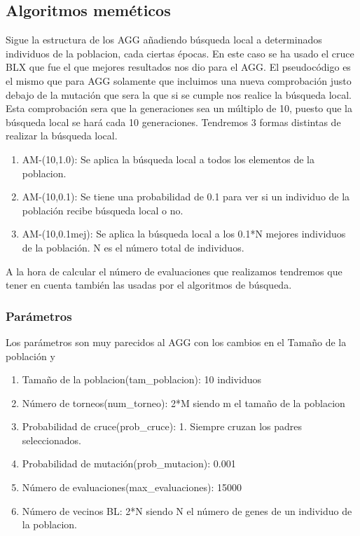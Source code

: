 \documentclass[titlepage]{article}
\begin{document}
	\subsection{Algoritmos meméticos}
	Sigue la estructura de los AGG añadiendo búsqueda local a determinados individuos de la poblacion, cada ciertas épocas. En este caso se ha usado el cruce BLX que fue el que mejores resultados nos dio para el AGG. El pseudocódigo es el mismo que para AGG solamente que incluimos una nueva comprobación justo debajo de la mutación que sera la que si se cumple nos realice la búsqueda local. Esta comprobación sera que la generaciones sea un múltiplo de 10, puesto que la búsqueda local se hará cada 10 generaciones. Tendremos 3 formas distintas de realizar la búsqueda local.
	
	\begin{enumerate}
		\item AM-(10,1.0): Se aplica la búsqueda local a todos los elementos de la poblacion.
		\item AM-(10,0.1): Se tiene una probabilidad de 0.1 para ver si un individuo de la población recibe búsqueda local o no.
		\item AM-(10,0.1mej): Se aplica la búsqueda local a los 0.1*N mejores individuos de la población. N es el número total de individuos.
	\end{enumerate}

	A la hora de calcular el número de evaluaciones que realizamos tendremos que tener en cuenta también las usadas por el algoritmos de búsqueda.

	\subsubsection{Parámetros}
	Los parámetros son muy parecidos al AGG con los cambios en el Tamaño de la población y 
	\begin{enumerate}
		\item Tamaño de la poblacion(tam\_poblacion): 10 individuos
		\item Número de torneos(num\_torneo): 2*M siendo m el tamaño de la poblacion
		\item Probabilidad de cruce(prob\_cruce): 1. Siempre cruzan los padres seleccionados.
		\item Probabilidad de mutación(prob\_mutacion): 0.001
		\item Número de evaluaciones(max\_evaluaciones): 15000
		\item Número de vecinos BL: 2*N siendo N el número de genes de un individuo de la poblacion.
	\end{enumerate}
\end{document}
